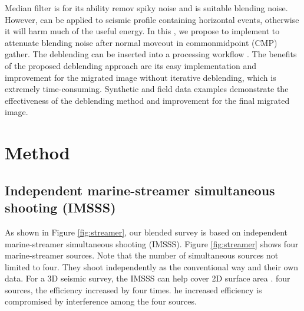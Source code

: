 Median filter  is  for its ability  remov spiky noise and  is  suitable  blending noise. However,  can  be applied  to seismic profile containing horizontal events, otherwise it will harm much of the useful energy. In this , we propose to implement  to attenuate blending noise after normal moveout in common\new{-}midpoint (CMP) gather. The deblending can be inserted into a  processing workflow . The benefits of the proposed deblending approach are its easy implementation and  improvement for the migrated image without  iterative deblending, which is extremely time-consuming. Synthetic and field data examples demonstrate the effectiveness of the deblending method and improvement for the final migrated image. 

\section{Method}
\subsection{Independent marine-streamer simultaneous shooting (IMSSS) }
As shown in Figure \ref{fig:streamer}, our blended survey is based on independent marine-streamer simultaneous shooting (IMSSS). Figure \ref{fig:streamer} shows four  marine-streamer sources. Note that the number of simultaneous sources  not  limited to four. They shoot independently as  the conventional way and  their own data. For a 3D seismic survey, the IMSSS can help  cover  2D surface area .  four sources, the efficiency  increased by four times. he  increased efficiency is compromised by  interference among the four sources. 

